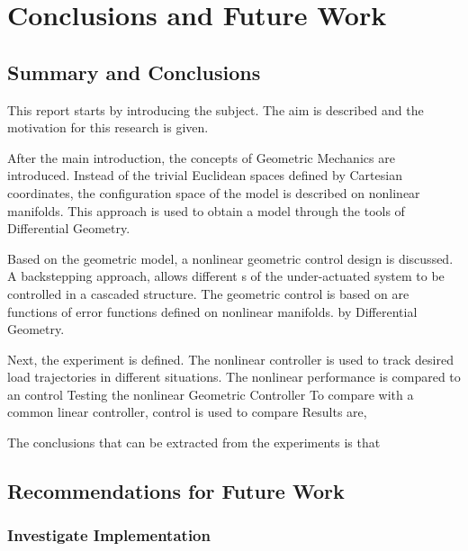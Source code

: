 \chapter{Conclusions and Future Work}\label{ch:conclusion}

\section{Summary and Conclusions}
This report starts by introducing the subject.
The aim is described and the motivation for this research is given.

After the main introduction, the concepts of Geometric Mechanics are introduced. 
Instead of the trivial Euclidean spaces defined by Cartesian coordinates, the configuration space of the model is described on nonlinear manifolds.
This approach is used to obtain a model through the tools of Differential Geometry. 

Based on the geometric model, a nonlinear geometric control design is discussed.  
A backstepping approach, allows different s of the under-actuated system to be controlled in a cascaded structure. 
The geometric control is based on 
 are functions
of error functions defined on nonlinear manifolds.
by Differential Geometry. 

Next, the experiment is defined. The nonlinear controller is used to track desired load trajectories in different situations. The nonlinear performance is compared to an  control 
Testing the nonlinear Geometric Controller
To compare with a common linear controller,  control is used to compare
Results are,

The conclusions that can be extracted from the experiments is that 

\section{Recommendations for Future Work}\label{ch:future}

\subsection{Investigate Implementation}

